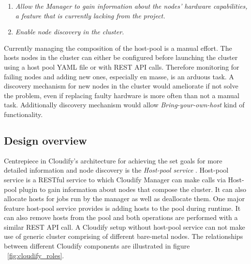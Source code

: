 \begin{enumerate}
\item \textit{Allow the Manager to gain information about the nodes' hardware capabilities, a feature that is currently lacking from the project.}
\item \textit{Enable node discovery in the cluster.}
\end{enumerate}

Currently managing the composition of the host-pool is a manual effort. The hosts nodes in the cluster can either be configured before launching the cluster using a host pool YAML file or with REST API calls. Therefore monitoring for failing nodes and adding new ones, especially en masse, is an arduous task. A discovery mechanism for new nodes in the cluster would ameliorate if not solve the problem, even if replacing faulty hardware is more often than not a manual task. Additionally discovery mechanism would allow \textit{Bring-your-own-host} kind of functionality.

 \subsection{Design overview}
 
 Centrepiece in Cloudify's architecture for achieving the set goals for more detailed information and node discovery is the \textit{Host-pool service} \cite{host-pool-service}. Host-pool service is a RESTful service to which Cloudify Manager can make calls via Host-pool plugin to gain information about nodes that compose the cluster. It can also allocate hosts for jobs run by the manager as well as deallocate them. One major feature host-pool service provides is adding hosts to the pool during runtime. It can also remove hosts from the pool and both operations are performed with a similar REST API call. A Cloudify setup without host-pool service can not make use of generic cluster comprising of different bare-metal nodes. The relationships between different Cloudify components are illustrated in figure ~\ref{fig:cloudify_roles}.
 
